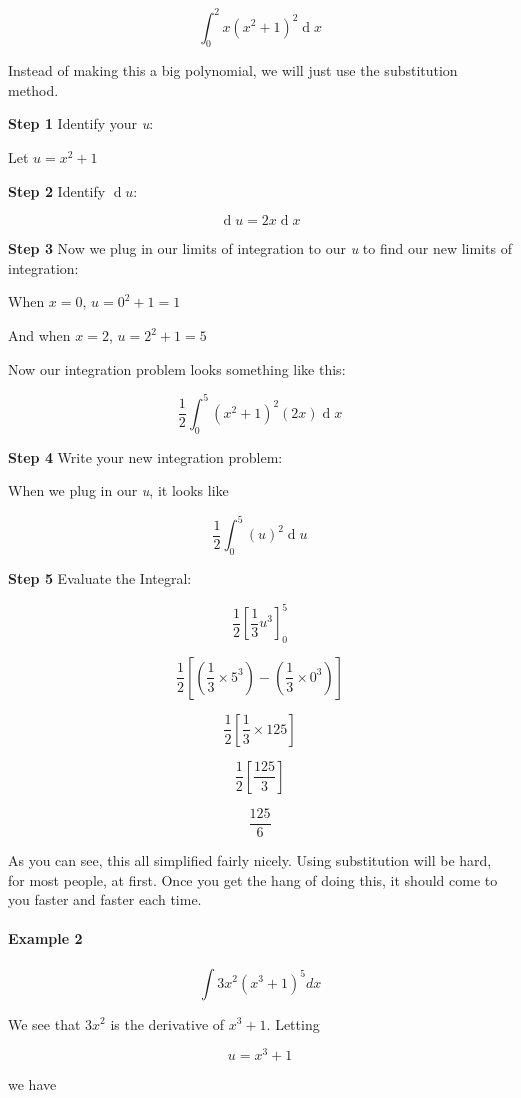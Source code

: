 $$\int_{0}^{2} x(x^2+1)^2 \operatorname{d}x$$

Instead of making this a big polynomial, we will just use the substitution method.

\textbf{Step 1}  
Identify your \textit{u}:

Let $u = x^2+1$

\textbf{Step 2}  
Identify $\operatorname{d}u$:

$$\operatorname{d}u = 2x\operatorname{d}x$$

\textbf{Step 3}  
Now we plug in our limits of integration to our \textit{u} to find our new limits of integration:

When $x = 0$, $u = 0^2 + 1 = 1$

And when $x = 2$, $u = 2^2 + 1 = 5$

Now our integration problem looks something like this:

$$\frac {1}{2} \int_{0}^{5} (x^2 + 1)^2 (2x)\operatorname{d}x$$

\textbf{Step 4}  
Write your new integration problem:

When we plug in our \textit{u}, it looks like

$$\frac {1}{2} \int_{0}^{5} (u)^2 \operatorname{d}u$$

\textbf{Step 5}  
Evaluate the Integral:

$$\frac {1}{2} \left[\frac {1}{3} u^3 \right]_{0}^{5}$$

$$\frac {1}{2} \left[\left(\frac {1}{3} \times 5^3 \right) - \left(\frac {1}{3} \times 0^3 \right)\right]$$

$$\frac {1}{2} \left[\frac {1}{3} \times 125 \right]$$

$$\frac {1}{2} \left[\frac {125}{3}\right]$$

$$\frac {125}{6}$$

As you can see, this all simplified fairly nicely. Using substitution will be hard, for most people, at first. Once you get the hang of doing this, it should come to you faster and faster each time.

\paragraph{Example 2}

$$\int 3x^2(x^3+1)^5dx$$

We see that $3x^2$ is the derivative of $x^3+1$. Letting

$$u=x^3+1$$

we have

